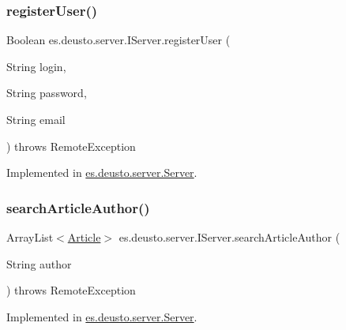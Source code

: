 \subsubsection{\texorpdfstring{register\+User()}{registerUser()}}
{\footnotesize\ttfamily Boolean es.\+deusto.\+server.\+I\+Server.\+register\+User (\begin{DoxyParamCaption}\item[{String}]{login,  }\item[{String}]{password,  }\item[{String}]{email }\end{DoxyParamCaption}) throws Remote\+Exception}



Implemented in \hyperlink{classes_1_1deusto_1_1server_1_1_server_a0ab63e5bc49a52ff84f7d6859161b683}{es.\+deusto.\+server.\+Server}.

\mbox{\label{interfacees_1_1deusto_1_1server_1_1_i_server_a92b587f25a7043b24d44f326d1c7b7ae}} 
\subsubsection{\texorpdfstring{search\+Article\+Author()}{searchArticleAuthor()}}
{\footnotesize\ttfamily Array\+List$<$\hyperlink{classes_1_1deusto_1_1server_1_1jdo_1_1_article}{Article}$>$ es.\+deusto.\+server.\+I\+Server.\+search\+Article\+Author (\begin{DoxyParamCaption}\item[{String}]{author }\end{DoxyParamCaption}) throws Remote\+Exception}



Implemented in \hyperlink{classes_1_1deusto_1_1server_1_1_server_a5f04113ce0c895e13e1bde76d7b41eb8}{es.\+deusto.\+server.\+Server}.

\mbox{\label{interfacees_1_1deusto_1_1server_1_1_i_server_ab08ccd2295e983571cf50431d273393a}} 
